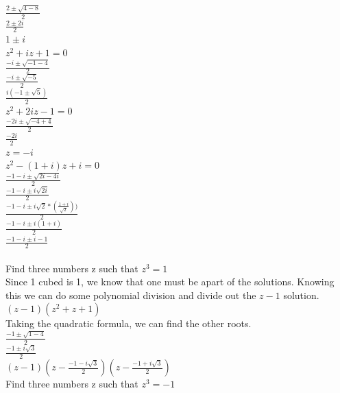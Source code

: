 \documentclass[12pt]{article}
\begin{document}
$\frac{2 \pm \sqrt{4 - 8}}{2}$\\
$\frac{2 \pm 2i}{2}$\\
$1 \pm i$\\


 $z^2 + iz + 1 = 0$\\

$\frac{-i \pm \sqrt{-1 - 4}}{2}$\\
$\frac{-i \pm \sqrt{-5}}{2}$\\
$\frac{i(-1 \pm \sqrt{5})}{2}$\\


 $z^2 + 2iz - 1 = 0$\\

$\frac{-2i \pm \sqrt{-4 + 4}}{2}$\\
$\frac{-2i}{2} $\\
$z = -i$\\


 $z^2 - (1 + i)z + i = 0$\\

$\frac{-1-i \pm \sqrt{2i - 4i}}{2}$\\
$\frac{-1-i \pm i\sqrt{2i}}{2}$\\
$\frac{-1-i \pm i\sqrt{2}*(\frac{1+i}{\sqrt{2}}))}{2}$\\
$\frac{-1-i \pm i(1+i)}{2}$\\
$\frac{-1-i \pm i-1}{2}$\\


\\

 Find three numbers z such that $z^3 = 1$\\

Since 1 cubed is 1, we know that one must be apart of the solutions.
Knowing this we can do some polynomial division and divide out the $z-1$ solution.\\
$(z-1)(z^2 + z + 1)$\\

Taking the quadratic formula, we can find the other roots.\\

$\frac{-1 \pm \sqrt{1-4}}{2}$\\
$\frac{-1 \pm i\sqrt{3}}{2}$\\

$(z-1)(z - \frac{-1 - i\sqrt{3}}{2})(z - \frac{-1 + i\sqrt{3}}{2})$\\


 Find three numbers z such that $z^3 = -1$\\
\end{document}
